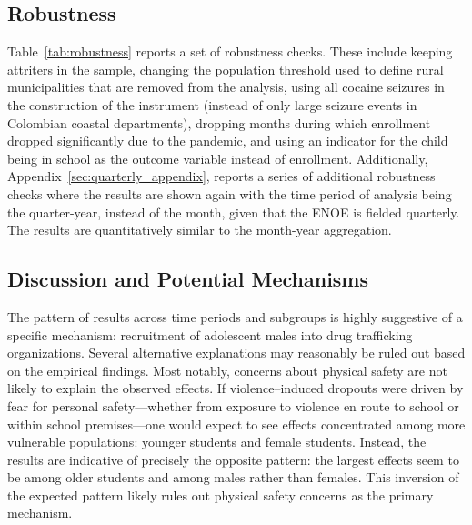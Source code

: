 \documentclass[12pt,letter,english,intoc,bibliography=totoc,index=totoc,BCOR10mm,captions=tableheading,nottitlepage,fleqn]{article}
\theoremstyle{break}
\begin{document}
\subsection*{Robustness}
Table~\ref{tab:robustness} reports a set of robustness checks. These include keeping attriters in the sample, changing the population threshold used to define rural municipalities that are removed from the analysis, using all cocaine seizures in the construction of the instrument (instead of only large seizure events in Colombian coastal departments), dropping months during which enrollment dropped significantly due to the pandemic, and using an indicator for the child being in school as the outcome variable instead of enrollment. Additionally, Appendix~\ref{sec:quarterly_appendix}, reports a series of additional robustness checks where the results are shown again with the time period of analysis being the quarter-year, instead of the month, given that the ENOE is fielded quarterly. The results are quantitatively similar to the month-year aggregation. 

\subsection*{Discussion and Potential Mechanisms}
The pattern of results across time periods and subgroups is highly suggestive of a specific mechanism: recruitment of adolescent males into drug trafficking organizations. Several alternative explanations may reasonably be ruled out based on the empirical findings. Most notably, concerns about physical safety are not likely to explain the observed effects. If violence--induced dropouts were driven by fear for personal safety---whether from exposure to violence en route to school or within school premises---one would expect to see effects concentrated among more vulnerable populations: younger students and female students. Instead, the results are indicative of precisely the opposite pattern: the largest effects seem to be among older students and among males rather than females. This inversion of the expected pattern likely rules out physical safety concerns as the primary mechanism.
\end{document}
